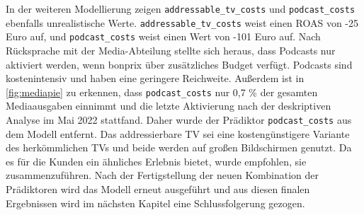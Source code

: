 In der weiteren Modellierung zeigen \verb|addressable_tv_costs| und \verb|podcast_costs| ebenfalls unrealistische Werte. \verb|addressable_tv_costs| weist einen \ac{ROAS} von -25 Euro auf, und \verb|podcast_costs| weist einen Wert von -101 Euro auf. Nach Rücksprache mit der Media-Abteilung stellte sich heraus, dass Podcasts nur aktiviert werden, wenn bonprix über zusätzliches Budget verfügt. Podcasts sind kostenintensiv und haben eine geringere Reichweite. Außerdem ist in \autoref{fig:mediapie} zu erkennen, dass \verb|podcast_costs| nur 0,7 \% der gesamten Mediaausgaben einnimmt und die letzte Aktivierung nach der deskriptiven Analyse im Mai 2022 stattfand. Daher wurde der Prädiktor \verb|podcast_costs| aus dem Modell entfernt. Das addressierbare TV sei eine kostengünstigere Variante des herkömmlichen TVs und beide werden auf großen Bildschirmen genutzt. Da es für die Kunden ein ähnliches Erlebnis bietet, wurde empfohlen, sie zusammenzuführen. Nach der Fertigstellung der neuen Kombination der Prädiktoren wird das Modell erneut ausgeführt und aus diesen finalen Ergebnissen wird im nächsten Kapitel eine Schlussfolgerung gezogen. 
